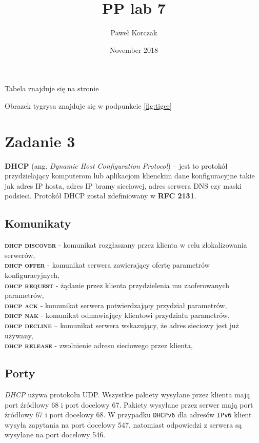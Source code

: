 \documentclass{article}
\title{PP lab 7}
\author{Paweł Korczak}
\date{November 2018}
\begin{document}
\maketitle
\newpage
\tableofcontents
\listoftables
Tabela znajduje się na stronie \pageref{tab:wojewodztwa} \\
\listoffigures
Obrazek tygrysa znajduje się w podpunkcie \ref{fig:tiger}

\section{Zadanie 3}
\textbf{DHCP} (ang. \textit{Dynamic Host Configuration Protocol}) – \textnormal{jest to protokół przydzielający komputerom lub aplikacjom klienckim dane konfiguracyjne takie jak adres IP hosta, adres IP bramy sieciowej, adres serwera DNS czy maski podsieci. Protokół DHCP został zdefiniowany w} \textbf{RFC 2131}.

\subsection{Komunikaty}
\noindent
\textbf{\textsc{dhcp discover}} - komunikat rozgłaszany przez klienta w celu zlokalizowania serwerów,\\
\textbf{\textsc{dhcp offer}} - komunikat serwera zawierający ofertę parametrów konfiguracyjnych,\\
\textbf{\textsc{dhcp request}} - żądanie przez klienta przydzielenia mu zaoferowanych parametrów,\\
\textbf{\textsc{dhcp ack}} - komunikat serwera potwierdzający przydział parametrów,\\
\textbf{\textsc{dhcp nak}} - komunikat odmawiający klientowi przydziału parametrów,\\
\textbf{\textsc{dhcp decline}} – komunikat serwera wskazujący, że adres sieciowy jest już używany,\\
\textbf{\textsc{dhcp release}} - zwolnienie adresu sieciowego przez klienta,\\

\subsection{Porty}
\emph{DHCP} używa protokołu UDP. Wszystkie pakiety wysyłane przez klienta mają port źródłowy 68 i port docelowy 67. Pakiety wysyłane przez serwer mają port źródłowy 67 i port docelowy 68. W przypadku \texttt{DHCPv6} dla adresów \texttt{IPv6} klient wysyła zapytania na port docelowy 547, natomiast odpowiedzi z serwera są wysyłane na port docelowy 546.
\end{document}
